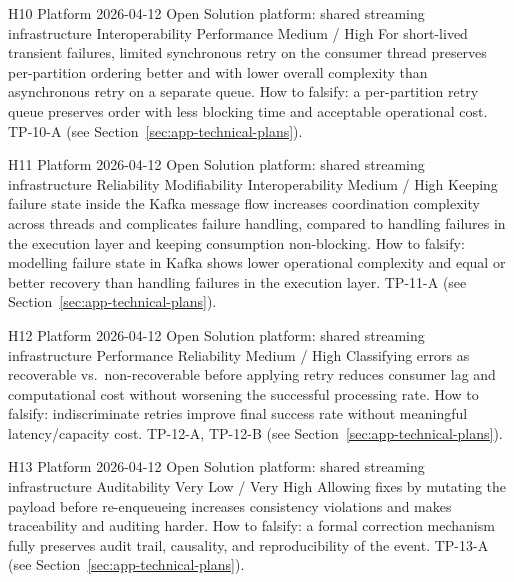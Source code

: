 \hypoboxnine%
  {H10}%
  {Platform}%
  {2026-04-12}%
  {Open}%
  {Solution}%
  {platform: shared streaming infrastructure}%
  {Interoperability \textbar{} Performance}%
  {Medium / High}%
  {For short-lived transient failures, limited synchronous retry on the consumer
   thread preserves per-partition ordering better and with lower overall complexity
   than asynchronous retry on a separate queue.}%
\hypoboxtail%
  {How to falsify: a per-partition retry queue preserves order with less blocking
   time and acceptable operational cost.}%
  {TP-10-A (see Section~\ref{sec:app-technical-plans}).}

\hypoboxnine%
  {H11}%
  {Platform}%
  {2026-04-12}%
  {Open}%
  {Solution}%
  {platform: shared streaming infrastructure}%
  {Reliability \textbar{} Modifiability \textbar{} Interoperability}%
  {Medium / High}%
  {Keeping failure state inside the Kafka message flow increases coordination
   complexity across threads and complicates failure handling, compared to
   handling failures in the execution layer and keeping consumption non-blocking.}%
\hypoboxtail%
  {How to falsify: modelling failure state in Kafka shows lower operational
   complexity and equal or better recovery than handling failures in the execution
   layer.}%
  {TP-11-A (see Section~\ref{sec:app-technical-plans}).}

\hypoboxnine%
  {H12}%
  {Platform}%
  {2026-04-12}%
  {Open}%
  {Solution}%
  {platform: shared streaming infrastructure}%
  {Performance \textbar{} Reliability}%
  {Medium / High}%
  {Classifying errors as recoverable vs.\ non-recoverable before applying retry
   reduces consumer lag and computational cost without worsening the successful
   processing rate.}%
\hypoboxtail%
  {How to falsify: indiscriminate retries improve final success rate without
   meaningful latency/capacity cost.}%
  {TP-12-A, TP-12-B (see Section~\ref{sec:app-technical-plans}).}

\hypoboxnine%
  {H13}%
  {Platform}%
  {2026-04-12}%
  {Open}%
  {Solution}%
  {platform: shared streaming infrastructure}%
  {Auditability}%
  {Very Low / Very High}%
  {Allowing fixes by mutating the payload before re-enqueueing increases
   consistency violations and makes traceability and auditing harder.}%
\hypoboxtail%
  {How to falsify: a formal correction mechanism fully preserves audit trail,
   causality, and reproducibility of the event.}%
  {TP-13-A (see Section~\ref{sec:app-technical-plans}).}

